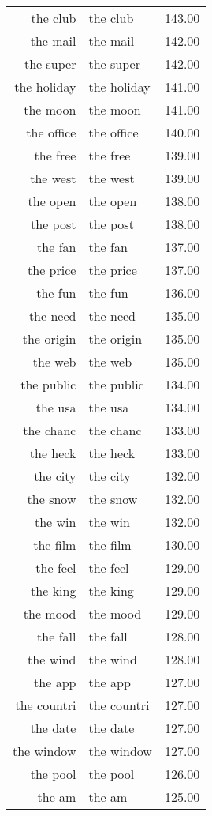 \begin{table}[ht]
\begin{tabular}{rlr}
  the club & the club & 143.00 \\ 
  the mail & the mail & 142.00 \\ 
  the super & the super & 142.00 \\ 
  the holiday & the holiday & 141.00 \\ 
  the moon & the moon & 141.00 \\ 
  the office & the office & 140.00 \\ 
  the free & the free & 139.00 \\ 
  the west & the west & 139.00 \\ 
  the open & the open & 138.00 \\ 
  the post & the post & 138.00 \\ 
  the fan & the fan & 137.00 \\ 
  the price & the price & 137.00 \\ 
  the fun & the fun & 136.00 \\ 
  the need & the need & 135.00 \\ 
  the origin & the origin & 135.00 \\ 
  the web & the web & 135.00 \\ 
  the public & the public & 134.00 \\ 
  the usa & the usa & 134.00 \\ 
  the chanc & the chanc & 133.00 \\ 
  the heck & the heck & 133.00 \\ 
  the city & the city & 132.00 \\ 
  the snow & the snow & 132.00 \\ 
  the win & the win & 132.00 \\ 
  the film & the film & 130.00 \\ 
  the feel & the feel & 129.00 \\ 
  the king & the king & 129.00 \\ 
  the mood & the mood & 129.00 \\ 
  the fall & the fall & 128.00 \\ 
  the wind & the wind & 128.00 \\ 
  the app & the app & 127.00 \\ 
  the countri & the countri & 127.00 \\ 
  the date & the date & 127.00 \\ 
  the window & the window & 127.00 \\ 
  the pool & the pool & 126.00 \\ 
  the am & the am & 125.00 \\ 

\end{tabular}
\end{table}
